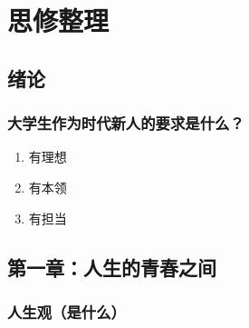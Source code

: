 \documentclass[
]{article}
\author{}
\date{}
\begin{document}
\hypertarget{header-n0}{%
\section{思修整理}\label{header-n0}}

\hypertarget{header-n2}{%
\subsection{绪论}\label{header-n2}}

\hypertarget{header-n3}{%
\subsubsection{大学生作为时代新人的要求是什么？}\label{header-n3}}

\begin{enumerate}
\def\labelenumi{\arabic{enumi}.}
\item
  有理想
\item
  有本领
\item
  有担当
\end{enumerate}

\hypertarget{header-n11}{%
\subsection{第一章：人生的青春之间}\label{header-n11}}

\hypertarget{header-n12}{%
\subsubsection{人生观（是什么）}\label{header-n12}}
\end{document}
